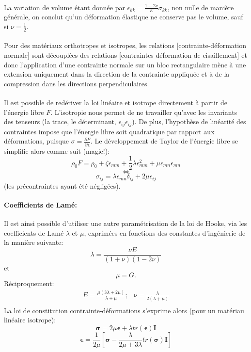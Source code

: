 \paragraph{}
La variation de volume étant donnée par $\epsilon_{kk}=\frac{1-2\nu}{E}\sigma_{kk}$, non nulle de manière générale, on conclut qu'un déformation élastique ne conserve pas le volume, sauf si $\nu=\frac{1}{2}$.
\paragraph{}
Pour des matériaux orthotropes et isotropes, les relations [contrainte-déformation normale] sont découplées des relations [contraintes-déformation de cisaillement] et donc l'application d'une contrainte normale sur un bloc rectangulaire mène à une extension uniquement dans la direction de la contrainte appliquée et à de la compression dans les directions perpendiculaires.
\paragraph{}
Il est possible de redériver la loi linéaire et isotrope directement à partir de l'énergie libre $F$. L'isotropie nous permet de ne travailler qu'avec les invariants des tenseurs (la trace, le déterminant, $\epsilon_{ij}\epsilon_{ij}$). De plus, l'hypothèse de linéarité des contraintes impose que l'énergie libre soit quadratique par rapport aux déformations, puisque $\sigma=\frac{\partial F}{\partial \boldsymbol{\epsilon}}$. Le développement de Taylor de l'énergie libre se simplifie alors comme suit (magie!):
$$\rho_0F=\rho_0+\zeta\epsilon_{mm}+\frac{1}{2}\lambda\epsilon_{mm}^2+\mu\epsilon_{mn}\epsilon_{mn}$$
$$\Leftrightarrow$$
$$\sigma_{ij}=\lambda\epsilon_{mn}\delta_{ij}+2\mu\epsilon_{ij}$$ (les précontraintes ayant été négligées).
\paragraph{Coefficients de Lamé: }
Il est ainsi possible d'utiliser une autre paramétrisation de la loi de Hooke, via les coefficients de Lamé $\lambda$ et $\mu$, exprimées en fonctions des constantes d'ingénierie de la manière suivante:
$$\lambda=\frac{\nu E}{(1+\nu)(1-2\nu)}$$ et $$\mu=G.$$
Réciproquement:
$$\begin{array}{cc}
E=\frac{\mu(3\lambda+2\mu)}{\lambda + \mu};&\nu=\frac{\lambda}{2(\lambda+\mu)}\\
\end{array}$$
La loi de constitution contrainte-déformations s'exprime alors (pour un matériau linéaire isotrope):
$$\boxed{\boldsymbol{\sigma}=2\mu\boldsymbol{\epsilon}+\lambda tr(\boldsymbol{\epsilon})\textbf{I}}$$
$$\boldsymbol{\epsilon}=\frac{1}{2\mu}\left[\boldsymbol{\sigma}-\frac{\lambda}{2\mu+3\lambda}tr(\boldsymbol{\sigma})\textbf{I}\right]$$

